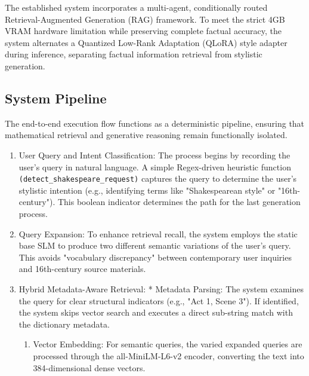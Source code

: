 \documentclass[10pt,conference]{IEEEtran}
\begin{document}
The established system incorporates a multi-agent, conditionally routed Retrieval-Augmented Generation (RAG) framework. To meet the strict 4GB VRAM hardware limitation while preserving complete factual accuracy, the system alternates a Quantized Low-Rank Adaptation (QLoRA) style adapter during inference, separating factual information retrieval from stylistic generation.
\subsection{System Pipeline}

The end-to-end execution flow functions as a deterministic pipeline, ensuring that mathematical retrieval and generative reasoning remain functionally isolated.
\begin{enumerate}
    \item User Query and Intent Classification: The process begins by 
    recording the user's query in natural language. A simple Regex-driven
    heuristic function 
    \verb|(detect_shakespeare_request)|
    captures the query to determine the user's stylistic intention (e.g., 
    identifying terms like "Shakespearean style" or "16th-century"). This 
    boolean indicator determines the path for the last generation process.
    \item Query Expansion: To enhance retrieval recall, the system employs the static base SLM to produce two different semantic variations of the user’s query. This avoids "vocabulary discrepancy" between contemporary user inquiries and 16th-century source materials.
    \item Hybrid Metadata-Aware Retrieval: * Metadata Parsing: The system examines the query for clear structural indicators (e.g., "Act 1, Scene 3"). If identified, the system skips vector search and executes a direct sub-string match with the dictionary metadata.
    \begin{enumerate}
        \item Vector Embedding: For semantic queries, the varied expanded queries are processed through the all-MiniLM-L6-v2 encoder, converting the text into 384-dimensional dense vectors.


\end{enumerate}
\end{enumerate}
\end{document}
